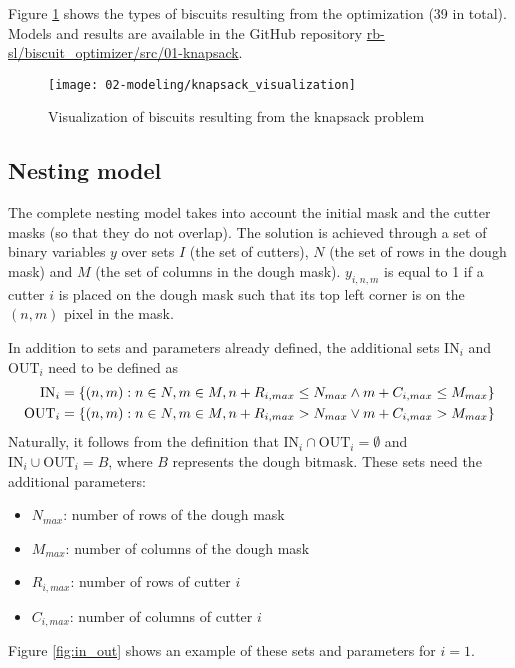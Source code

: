 Figure \ref{fig:knapsack} shows the types of biscuits resulting from the optimization (39 in total). Models and results are available in the GitHub repository \href{https://github.com/rb-sl/biscuit_optimizer/tree/main/src/01-knapsack}{rb-sl/biscuit\_optimizer/src/01-knapsack}.

\begin{figure}[H]
	\centering	
	\texttt{[image: 02-modeling/knapsack\_visualization]}
	\caption{Visualization of biscuits resulting from the knapsack problem}
	\label{fig:knapsack}
\end{figure}

\subsection{Nesting model}
The complete nesting model takes into account the initial mask and the cutter masks (so that they do not overlap). The solution is achieved through a set of binary variables $y$ over sets $I$ (the set of cutters), $N$ (the set of rows in the dough mask) and $M$ (the set of columns in the dough mask). $y_{i, n, m}$ is equal to 1 if a cutter $i$ is placed on the dough mask such that its top left corner is on the $(n, m)$ pixel in the mask.

In addition to sets and parameters already defined, the additional sets $\textrm{IN}_i$ and $\textrm{OUT}_i$ need to be defined as
\begin{alignat}{1}
	\textrm{IN}_i	& = \{(n, m): n \in N, m \in M, n + R_{i,max} \leq N_{max} \wedge m + C_{i,max} \leq M_{max} \} \notag \\
	\textrm{OUT}_i 	& = \{(n, m): n \in N, m \in M, n + R_{i,max} > N_{max} \vee m + C_{i,max} > M_{max} \} \notag
\end{alignat}
Naturally, it follows from the definition that $\textrm{IN}_i \cap \textrm{OUT}_i = \emptyset$ and $\textrm{IN}_i \cup \textrm{OUT}_i = B$, where $B$ represents the dough bitmask.
These sets need the additional parameters:
\begin{itemize}[itemsep=-1mm, topsep=-1mm]
	\item $N_{max}$: number of rows of the dough mask
	\item $M_{max}$: number of columns of the dough mask
	\item $R_{i,max}$: number of rows of cutter $i$
	\item $C_{i,max}$: number of columns of cutter $i$
\end{itemize}
Figure \ref{fig:in_out} shows an example of these sets and parameters for $i=1$.

